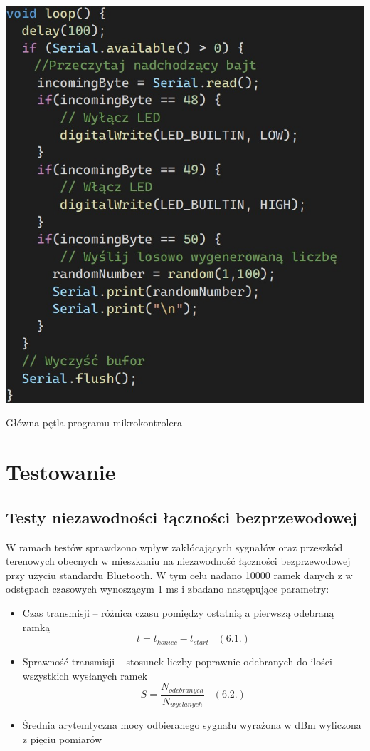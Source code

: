 \documentclass[12pt, twoside, openany]{mwrep}
\begin{document}
\begin{algorithm}[H]
\centering
\includegraphics[scale=0.7]{kod_node}
\caption{Główna pętla programu mikrokontrolera}
\end{algorithm}

\chapter{Testowanie}

\section{Testy niezawodności łączności bezprzewodowej}
W ramach testów sprawdzono wpływ zakłócających sygnałów oraz przeszkód terenowych obecnych w mieszkaniu na niezawodność łączności bezprzewodowej przy użyciu standardu Bluetooth. W tym celu nadano 10000 ramek danych z w odstępach czasowych wynoszącym 1 ms i zbadano następujące parametry:

\begin{itemize}
\item Czas transmisji – różnica czasu pomiędzy ostatnią a pierwszą odebraną ramką \[ t = t_{koniec} - t_{start} \; \; \;  (6.1.)\]
\item	Sprawność transmisji – stosunek liczby poprawnie odebranych do ilości wszystkich wysłanych ramek\[ S = \frac{N_{odebranych}}{N_{wyslanych}} \; \; \;  (6.2.)\]
\item	Średnia arytemtyczna mocy odbieranego sygnału wyrażona w dBm wyliczona z pięciu pomiarów
\end{itemize}
\end{document}
